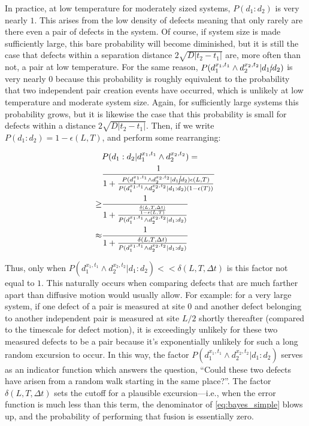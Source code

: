 \documentclass[twocolumn,superscriptaddress,aps,prb,floatfix]{revtex4-1}
\begin{document}
In practice, at low temperature for moderately sized systems, $P(d_1 : d_2)$ is very nearly $1$.  This arises from the low density of defects meaning that only rarely are there even a pair of defects in the system.  Of course, if system size is made sufficiently large, this bare probability will become diminished, but it is still the case that defects within a separation distance $2\sqrt{D |t_2 - t_1|}$ are, more often than not, a pair at low temperature.  For the same reason, $P(d_1^{x_1,t_1} \wedge d_2^{x_2,t_2} | d_1\cancel{:}d_2)$ is very nearly $0$ because this probability is roughly equivalent to the probability that two independent pair creation events have occurred, which is unlikely at low temperature and moderate system size.  Again, for sufficiently large systems this probability grows, but it is likewise the case that this probability is small for defects within a distance $2\sqrt{D |t_2 - t_1|}$.  Then, if we write $P(d_1 : d_2) = 1 - \epsilon(L,T)$, and perform some rearranging:

\begin{align}
\label{eq:bayes_simple}
&P(d_1:d_2 | d_1^{x_1,t_1} \wedge d_2^{x_2,t_2}) = \\ \notag
&\frac{1}{1+\frac{P(d_1^{x_1,t_1} \wedge d_2^{x_2,t_2} | d_1\cancel{:}d_2) \epsilon(L,T)}{P(d_1^{x_1,t_1} \wedge d_2^{x_2,t_2} | d_1:d_2) (1-\epsilon(T))}} \\ \notag
\geq &\frac{1}{1+\frac{\frac{\delta(L,T,\Delta t)}{1-\epsilon(L,T)}} {P(d_1^{x_1,t_1} \wedge d_2^{x_2,t_2} | d_1:d_2)}} \\ \notag
\approx &\frac{1}{1+\frac{\delta(L,T,\Delta t)}{P(d_1^{x_1,t_1} \wedge d_2^{x_2,t_2} | d_1:d_2)}}
\end{align}

Thus, only when $P(d_1^{x_1,t_1} \wedge d_2^{x_2,t_2} | d_1:d_2) << \delta(L,T,\Delta t)$ is this factor not equal to $1$.  This naturally occurs when comparing defects that are much farther apart than diffusive motion would usually allow.  For example: for a very large system, if one defect of a pair is measured at site $0$ and another defect belonging to another independent pair is measured at site $L/2$ shortly thereafter (compared to the timescale for defect motion), it is exceedingly unlikely for these two measured defects to be a pair because it's exponentially unlikely for such a long random excursion to occur.  In this way, the factor $P(d_1^{x_1,t_1} \wedge d_2^{x_2,t_2} | d_1:d_2)$  serves as an indicator function which answers the question, ``Could these two defects have arisen from a random walk starting in the same place?''.  The factor $\delta(L,T,\Delta t)$ sets the cutoff for a plausible excursion---i.e., when the error function is much less than this term, the denominator of \ref{eq:bayes_simple} blows up, and the probability of performing that fusion is essentially zero.
\end{document}

